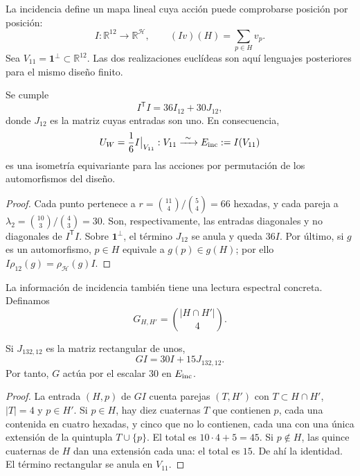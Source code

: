 La incidencia define un mapa lineal cuya acción puede comprobarse
posición por posición:
\begin{equation}
 I:\mathbb R^{12}\longrightarrow\mathbb R^{\mathcal H},
 \qquad (Iv)(H)=\sum_{p\in H}v_p.
 \label{x_reciprocidad:exc:incidencia}
\end{equation}
Sea $V_{11}=\mathbf1^\perp\subset\mathbb R^{12}$. Las dos realizaciones
euclídeas son aquí lenguajes posteriores para el mismo diseño finito.

\begin{proposition}
\label{x_reciprocidad:exc:isometria}
Se cumple
\[
 I^{\mathsf T}I=36I_{12}+30J_{12},
\]
donde $J_{12}$ es la matriz cuyas entradas son uno. En consecuencia,
\[
 U_W=\frac16 I\big|_{V_{11}}:
 V_{11}\xrightarrow{\ \sim\ }E_{\rm inc}:=I(V_{11})
\]
es una isometría equivariante para las acciones por permutación de los
automorfismos del diseño.
\end{proposition}

\begin{proof}
Cada punto pertenece a
$r=\binom{11}{4}/\binom54=66$ hexadas, y cada pareja a
$\lambda_2=\binom{10}{3}/\binom43=30$. Son, respectivamente, las
entradas diagonales y no diagonales de $I^{\mathsf T}I$. Sobre
$\mathbf1^\perp$, el término $J_{12}$ se anula y queda $36I$.
Por último, si $g$ es un automorfismo, $p\in H$ equivale a
$g(p)\in g(H)$; por ello $I\rho_{12}(g)=\rho_{\mathcal H}(g)I$.
\end{proof}

La información de incidencia también tiene una lectura espectral
concreta. Definamos
\[
 G_{H,H'}=\binom{|H\cap H'|}{4}.
\]

\begin{lemma}
\label{x_reciprocidad:exc:espectro}
Si $J_{132,12}$ es la matriz rectangular de unos,
\[
 GI=30I+15J_{132,12}.
\]
Por tanto, $G$ actúa por el escalar $30$ en $E_{\rm inc}$.
\end{lemma}

\begin{proof}
La entrada $(H,p)$ de $GI$ cuenta parejas $(T,H')$ con
$T\subset H\cap H'$, $|T|=4$ y $p\in H'$. Si $p\in H$, hay diez
cuaternas $T$ que contienen $p$, cada una contenida en cuatro hexadas,
y cinco que no lo contienen, cada una con una única extensión de la
quintupla $T\cup\{p\}$. El total es $10\cdot4+5=45$.
Si $p\notin H$, las quince cuaternas de $H$ dan una extensión cada
una: el total es $15$. De ahí la identidad. El término rectangular
se anula en $V_{11}$.
\end{proof}

